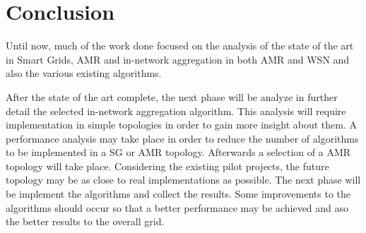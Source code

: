\chapter{Conclusion}\label{c:conc}
Until now, much of the work done focused on the analysis of the state of the art in Smart Grids, AMR and in-network aggregation in both AMR and WSN and also the various existing algorithms.

After the state of the art complete, the next phase will be analyze in further detail the selected in-network aggregation algorithm. This analysis will require implementation in simple topologies in order to gain more insight about them. A performance analysis may take place in order to reduce the number of algorithms to be implemented in a SG or AMR topology. Afterwards a selection of a AMR topology will take place. Considering the existing pilot projects, the future topology may be as close to real implementations as possible. The next phase will be implement the algorithms and collect the results. Some improvements to the algorithms should occur so that a better performance may be achieved and aso the better results to the overall grid.  


